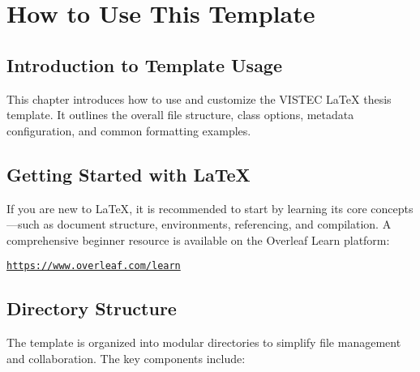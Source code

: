 \chapter{How to Use This Template}
\label{chapter3}

\section{Introduction to Template Usage}
\label{ch3:template-overview}

\begin{paragraph}
This chapter introduces how to use and customize the VISTEC {\LaTeX} thesis template. It outlines the overall file structure, class options, metadata configuration, and common formatting examples.
\end{paragraph}

\section{Getting Started with {\LaTeX}}
\label{ch3:latex-getting-started}

\begin{paragraph}
If you are new to {\LaTeX}, it is recommended to start by learning its core concepts—such as document structure, environments, referencing, and compilation. A comprehensive beginner resource is available on the Overleaf Learn platform:
\end{paragraph}

\begin{center}
\href{https://www.overleaf.com/learn}{\texttt{https://www.overleaf.com/learn}}
\end{center}

\section{Directory Structure}
\label{ch3:directory-structure}

\begin{paragraph}
The template is organized into modular directories to simplify file management and collaboration. The key components include:
\end{paragraph}

